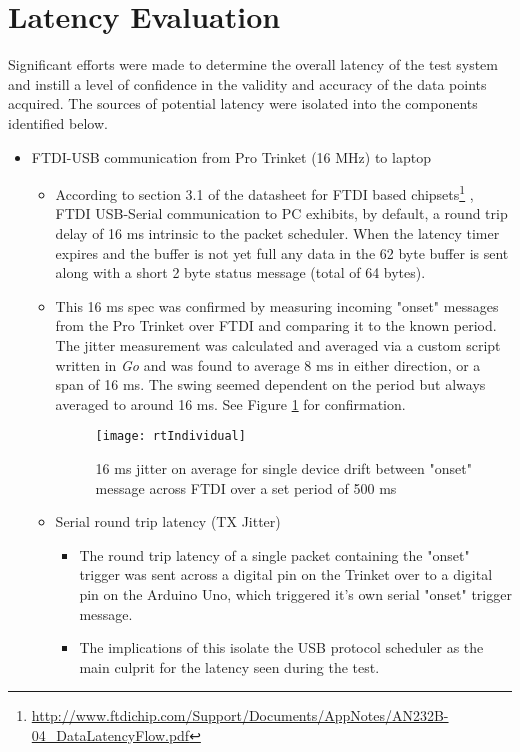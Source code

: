 \section{Latency Evaluation} \label{latencyCalc}
Significant efforts were made to determine the overall latency of the test system and instill a level of confidence in the validity and accuracy of the data points acquired. The sources of potential latency were isolated into the components identified below.
\begin{itemize}
    \item FTDI-USB communication from Pro Trinket (16 MHz) to laptop
    \begin{itemize}
        \item According to section 3.1 of the datasheet for FTDI based chipsets\footnote{\url{http://www.ftdichip.com/Support/Documents/AppNotes/AN232B-04_DataLatencyFlow.pdf}} , FTDI USB-Serial communication to PC exhibits, by default, a round trip delay of 16 ms intrinsic to the packet scheduler. When the latency timer expires and the buffer is not yet full any data in the 62 byte buffer is sent along with a short 2 byte status message (total of 64 bytes).
        \item This 16 ms spec was confirmed by measuring incoming "onset" messages from the Pro Trinket over FTDI and comparing it to the known period. The jitter measurement was calculated and averaged via a custom script written in \textit{Go} and was found to average 8 ms in either direction, or a span of 16 ms. The swing seemed dependent on the period but always averaged to around 16 ms. See Figure \ref{fig:rtIndividual} for confirmation.
        \begin{figure}[H] 
            \centering  
            \texttt{[image: rtIndividual]}
            \caption{16 ms jitter on average for single device drift between "onset" message across FTDI over a set period of 500 ms}
            \label{fig:rtIndividual}
        \end{figure}
    \item Serial round trip latency (TX Jitter)
        \begin{itemize}
            \item The round trip latency of a single packet containing the "onset" trigger was sent across a digital pin on the Trinket over to a digital pin on the Arduino Uno, which triggered it's own serial "onset" trigger message.
            \item The implications of this isolate the USB protocol scheduler as the main culprit for the latency seen during the test.

\end{itemize}
\end{itemize}
\end{itemize}
